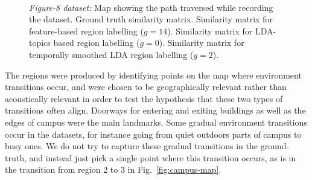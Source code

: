 \begin{figure}
\begin{minipage}{0.45\textwidth}
{            \label{fig:figure8-words}
        } \\
    \end{minipage}
    
    \caption{\emph{Figure-8 dataset:} 
        \protect{} Map showing the path traversed while recording the dataset.
        \protect{} Ground truth similarity matrix.
        \protect{} Similarity matrix for feature-based region labelling ($g=14$).
        \protect{} Similarity matrix for LDA-topics based region labelling ($g=0$).
        \protect{} Similarity matrix for temporally smoothed LDA region labelling ($g=2$).
    }
    \label{fig:dataset-f8}
\end{figure}

The regions were produced by identifying points on the map where environment transitions occur, and were chosen to be geographically relevant rather than acoustically relevant in order to test the hypothesis that these two types of transitions often align. Doorways for entering and exiting buildings as well as the edges of campus were the main landmarks. Some gradual environment transitions occur in the datasets, for instance going from quiet outdoors parts of campus to busy ones. We do not try to capture these gradual transitions in the ground-truth, and instead just pick a single point where this transition occurs, as is in the transition from region 2 to 3 in Fig.~\ref{fig:campus-map}.

